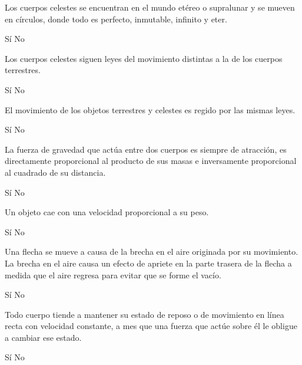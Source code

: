 \begin{parts}
    Los cuerpos celestes se encuentran en el mundo etéreo o supralunar y se mueven en círculos, donde todo es perfecto, inmutable, infinito y eter.

    \begin{oneparchoices}
        \choice Sí
        \choice No
    \end{oneparchoices}

    Los cuerpos celestes siguen leyes del movimiento distintas a la de los cuerpos terrestres.

    \begin{oneparchoices}
        \choice Sí
        \choice No
    \end{oneparchoices}

    El movimiento de los objetos terrestres y celestes es regido por las mismas leyes.

    \begin{oneparchoices}
        \choice Sí
        \choice No
    \end{oneparchoices}

    La fuerza de gravedad que actúa entre dos cuerpos es siempre de atracción, es directamente proporcional al producto de sus masas e inversamente proporcional al cuadrado de su distancia.

    \begin{oneparchoices}
        \choice Sí
        \choice No
    \end{oneparchoices}

    Un objeto cae con una velocidad proporcional a su peso.

    \begin{oneparchoices}
        \choice Sí
        \choice No
    \end{oneparchoices}

    Una flecha se mueve a causa de la brecha en el aire originada por su movimiento. La brecha en el aire causa un efecto de apriete en la parte trasera de la flecha a medida que el aire regresa para evitar que se forme el vacío.

    \begin{oneparchoices}
        \choice Sí
        \choice No
    \end{oneparchoices}

    Todo cuerpo tiende a mantener su estado de reposo o de movimiento en línea recta con velocidad constante, a mes que una fuerza que actúe sobre él le obligue a cambiar ese estado.

    \begin{oneparchoices}
        \choice Sí
        \choice No
    \end{oneparchoices}


\end{parts}
